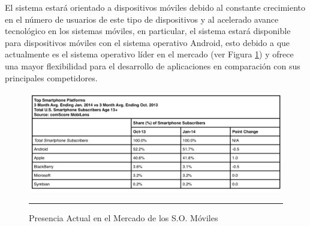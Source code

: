El sistema estará orientado a dispositivos móviles debido al constante crecimiento en el número de usuarios de este tipo de dispositivos y al acelerado avance tecnológico en los sistemas móviles, en particular, el sistema estará disponible para dispositivos móviles con el sistema operativo Android, esto debido a que actualmente es el sistema operativo líder en el mercado (ver Figura \ref{fig:moviles})\cite{moviles} y ofrece una mayor flexibilidad para el desarrollo de aplicaciones en comparación con sus principales competidores.

\begin{figure}[htbp]
	\centering
		\includegraphics[width=1\textwidth]{Figuras/moviles.png}
		\rule{35em}{0.5pt}
	\caption[Mercado de los S.O. Móviles]{Presencia Actual en el Mercado de los S.O. Móviles}
	\label{fig:moviles}
\end{figure}